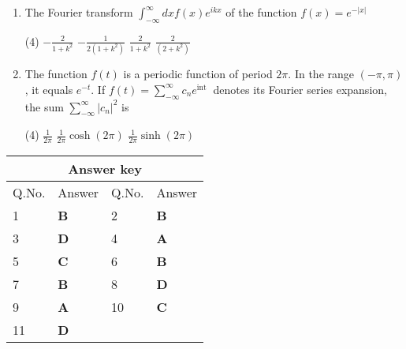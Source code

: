 \begin{enumerate}[label=\color{ocre}\textbf{\arabic*.}]
	{}
	\begin{tasks}(4)
		\task[\textbf{A.}] $\frac{1}{(s+a)(s+b)}$
		\task[\textbf{B.}] $\frac{1}{b(s+a)}$
		\task[\textbf{C.}] $\frac{1}{a(s+b)}$
		\task[\textbf{D.}] $\frac{e^{-a}-e^{-b}}{b-a}$
	\end{tasks}
	\item  The Fourier transform $\int_{-\infty}^{\infty} d x f(x) e^{i k x}$ of the function $f(x)=e^{-|x|}$
	{}
	\begin{tasks}(4)
		\task[\textbf{A.}] $-\frac{2}{1+k^{2}}$
		\task[\textbf{B.}] $-\frac{1}{2\left(1+k^{2}\right)}$
		\task[\textbf{C.}] $\frac{2}{1+k^{2}}$
		\task[\textbf{D.}] $\frac{2}{\left(2+k^{2}\right)}$
	\end{tasks}
	\item The function $f(t)$ is a periodic function of period $2 \pi$. In the range $(-\pi, \pi)$, it equals $e^{-t}$. If $f(t)=\sum_{-\infty}^{\infty} c_{n} e^{\text {int }}$ denotes its Fourier series expansion, the sum $\sum_{-\infty}^{\infty}\left|c_{n}\right|^{2}$ is
	{}
	\begin{tasks}(4)
		\task[\textbf{B.}] $\frac{1}{2 \pi}$
		\task[\textbf{C.}] $\frac{1}{2 \pi} \cosh (2 \pi)$
		\task[\textbf{D.}]  $\frac{1}{2 \pi} \sinh (2 \pi)$
	\end{tasks}
	\end{enumerate}
\setlength\arrayrulewidth{1pt}
\begin{table}[H]
	\centering
	\begin{tabular}{|p{1.5cm}|p{1.5cm}||p{1.5cm}|p{1.5cm}|}
		\hline
		\multicolumn{4}{|c|}{\textbf{Answer key}}\\\hline\hline
		\rowcolor{ocrel}Q.No.&Answer&Q.No.&Answer\\\hline
		1&\textbf{B} &2&\textbf{B}\\\hline 
		3&\textbf{D} &4&\textbf{A} \\\hline
		5&\textbf{C} &6&\textbf{B} \\\hline
		7&\textbf{B}&8&\textbf{D}\\\hline
		9&\textbf{A}&10&\textbf{C}\\\hline
		11&\textbf{D} &&\textbf{}\\\hline
		
	\end{tabular}
\end{table}

